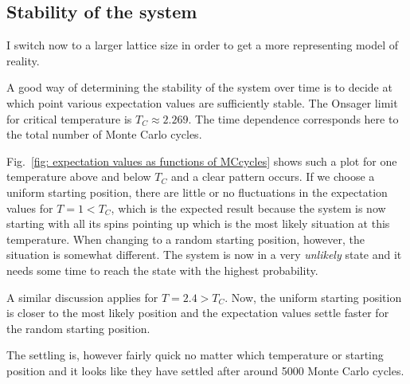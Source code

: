 \documentclass[twoside, 11pt]{article}
\begin{document}
	\subsection{Stability of the system}
		I switch now to a larger lattice size in order to get a more representing model of reality.
		
		A good way of determining the stability of the system over time is to decide at which point various expectation values are sufficiently stable. The Onsager limit for critical temperature is $T_C \approx 2.269$. The time dependence corresponds here to the total number of Monte Carlo cycles.
		
		Fig.~\ref{fig: expectation values as functions of MCcycles} shows such a plot for one temperature above and below $T_C$ and a clear pattern occurs. If we choose a uniform starting position, there are little or no fluctuations in the expectation values for $T=1<T_C$, which is the expected result because the system is now starting with all its spins pointing up which is the most likely situation at this temperature. When changing to a random starting position, however, the situation is somewhat different. The system is now in a very \textit{unlikely} state and it needs some time to reach the state with the highest probability. 
		
		A similar discussion applies for $T=2.4>T_C$. Now, the uniform starting position is closer to the most likely position and the expectation values settle faster for the random starting position. 
		
		The settling is, however fairly quick no matter which temperature or starting position and it looks like they have settled after around 5000 Monte Carlo cycles.
		
\end{document}
